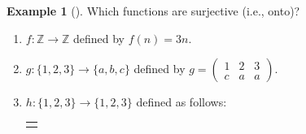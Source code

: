 \documentclass[10pt,]{book}
\theoremstyle{plain}
\theoremstyle{definition}
\theoremstyle{definition}
\newtheorem{example}[theorem]{Example}
\theoremstyle{definition}
\numberwithin{equation}{chapter}
\newlength{\panelmax}
\def\Z{\mathbb Z}
\newcommand{\amp}{&}
\begin{document}
\begin{example}[]\label{example-30}
\hypertarget{p-2126}{}%
Which functions are surjective (i.e., onto)?%
\par
\hypertarget{p-2127}{}%
\leavevmode%
\begin{enumerate}
\item\hypertarget{li-372}{}\(f:\Z \to \Z\) defined by \(f(n) = 3n\).%
\item\hypertarget{li-373}{}\(g: \{1,2,3\} \to \{a,b,c\}\) defined by \(g = \begin{pmatrix}1 \amp 2 \amp 3 \\ c \amp a \amp a \end{pmatrix}\).%
\item\hypertarget{li-374}{}\hypertarget{p-2128}{}%
\(h:\{1,2,3\} \to \{1,2,3\}\) defined as follows:%
{%
\setlength{\panelmax}{0pt}
\ifdefined\panelboxAimage\else\newsavebox{\panelboxAimage}\fi%
\begin{lrbox}{\panelboxAimage}
\end{lrbox}
\ifdefined\phAimage\else\newlength{\phAimage}\fi%
\setlength{\phAimage}{\ht\panelboxAimage+\dp\panelboxAimage}
\settototalheight{\phAimage}{\usebox{\panelboxAimage}}
\setlength{\panelmax}{\maxof{\panelmax}{\phAimage}}
\leavevmode%
\setlength{\tabcolsep}{0\linewidth}
\par\medskip\noindent
\hspace*{0.4\linewidth}%
\begin{tabular}{@{}*{1}{c}@{}}
\begin{minipage}[c][\panelmax][t]{0.2\linewidth}\usebox{\panelboxAimage}\end{minipage}\end{tabular}\\
}%
\end{enumerate}
%
\par\smallskip%

\end{example}
\end{document}
